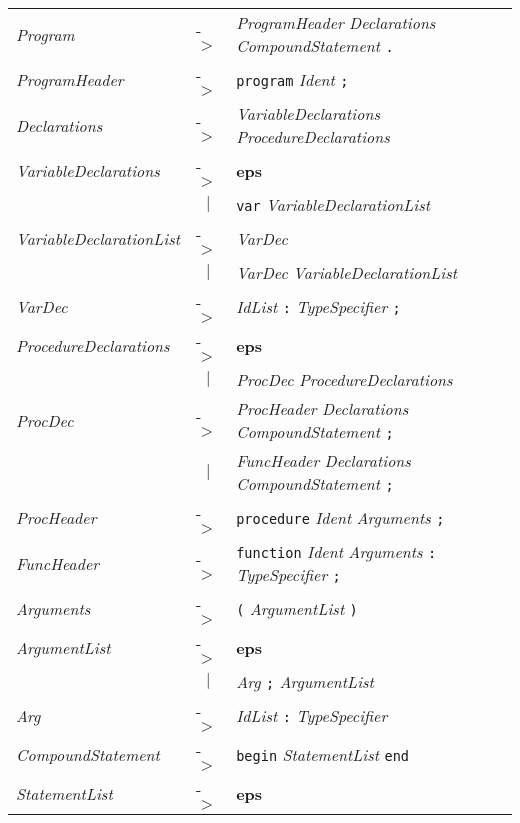 \documentclass{article}
\begin{document}
\begin{center}\begin{tabular}{lll}
\textit{Program} & -$>$ & \textit{ProgramHeader} \textit{Declarations} \textit{CompoundStatement} \texttt{.} \\
\textit{ProgramHeader} & -$>$ & \texttt{program} \textit{Ident} \texttt{;} \\
\textit{Declarations} & -$>$ & \textit{VariableDeclarations} \textit{ProcedureDeclarations} \\
\textit{VariableDeclarations} & -$>$ & \textbf{eps} \\
 & \multicolumn{1}{c}{\textbf{$|$}} & \texttt{var} \textit{VariableDeclarationList} \\
\textit{VariableDeclarationList} & -$>$ & \textit{VarDec} \\
 & \multicolumn{1}{c}{\textbf{$|$}} & \textit{VarDec} \textit{VariableDeclarationList} \\
\textit{VarDec} & -$>$ & \textit{IdList} \texttt{:} \textit{TypeSpecifier} \texttt{;} \\
\textit{ProcedureDeclarations} & -$>$ & \textbf{eps} \\
 & \multicolumn{1}{c}{\textbf{$|$}} & \textit{ProcDec} \textit{ProcedureDeclarations} \\
\textit{ProcDec} & -$>$ & \textit{ProcHeader} \textit{Declarations} \textit{CompoundStatement} \texttt{;} \\
 & \multicolumn{1}{c}{\textbf{$|$}} & \textit{FuncHeader} \textit{Declarations} \textit{CompoundStatement} \texttt{;} \\
\textit{ProcHeader} & -$>$ & \texttt{procedure} \textit{Ident} \textit{Arguments} \texttt{;} \\
\textit{FuncHeader} & -$>$ & \texttt{function} \textit{Ident} \textit{Arguments} \texttt{:} \textit{TypeSpecifier} \texttt{;} \\
\textit{Arguments} & -$>$ & \texttt{(} \textit{ArgumentList} \texttt{)} \\
\textit{ArgumentList} & -$>$ & \textbf{eps} \\
 & \multicolumn{1}{c}{\textbf{$|$}} & \textit{Arg} \texttt{;} \textit{ArgumentList} \\
\textit{Arg} & -$>$ & \textit{IdList} \texttt{:} \textit{TypeSpecifier} \\
\textit{CompoundStatement} & -$>$ & \texttt{begin} \textit{StatementList} \texttt{end} \\
\textit{StatementList} & -$>$ & \textbf{eps} \\

\end{tabular}
\end{center}
\end{document}

